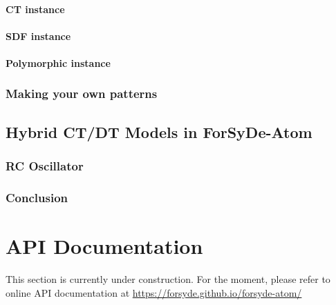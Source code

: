 \documentclass{book}
\newcommand*{\RootPath}{../../}%
\begin{document}
\begin{refsection}
\subsection{CT instance}
\label{sec:ct-instance}


\subsection{SDF instance}
\label{sec:sdf-instance}


\subsection{Polymorphic instance}
\label{sec:poly-instance}


\section{Making your own patterns}
\label{sec:making-your-own}


\label{sec:conclusion}


\printbibliography[heading=subbibliography]
\end{refsection}

\begin{refsection}
\chapter{Hybrid CT/DT Models in {{\sc ForSyDe-Atom}}}
\label{ch:hybrid}
\renewcommand*{\RootPath}{../../hybrid/docs/latex}%
\graphicspath{{../../hybrid/docs/latex/figs/}}


\begin{summary}

\end{summary}
\minitoc



\section{RC Oscillator}
\label{sec:rc-oscillator}


\section{Conclusion}
\label{sec:conclusion}


\printbibliography[heading=subbibliography]
\end{refsection}

\part{API Documentation}
\label{part:api-documentation}

\begin{summary}
  This section is currently under construction. For the moment, please refer to online API documentation at \url{https://forsyde.github.io/forsyde-atom/}
\end{summary}
\end{document}
